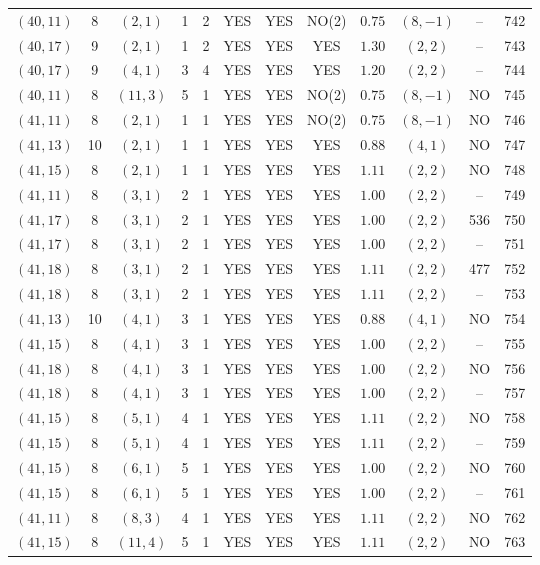 \begin{longtable}{|c|c|c|c|c|c|c|c|c|c|c|c|}
$(40,11)$ & 8 & $(2,1)$ & 1 & 2 & YES & YES & NO(2) & $0.75$ & $(8,-1)$ & -- & 742\\
$(40,17)$ & 9 & $(2,1)$ & 1 & 2 & YES & YES & YES & $1.30$ & $(2,2)$ & -- & 743\\
$(40,17)$ & 9 & $(4,1)$ & 3 & 4 & YES & YES & YES & $1.20$ & $(2,2)$ & -- & 744\\
$(40,11)$ & 8 & $(11,3)$ & 5 & 1 & YES & YES & NO(2) & $0.75$ & $(8,-1)$ & NO & 745\\
$(41,11)$ & 8 & $(2,1)$ & 1 & 1 & YES & YES & NO(2) & $0.75$ & $(8,-1)$ & NO & 746\\
$(41,13)$ & 10 & $(2,1)$ & 1 & 1 & YES & YES & YES & $0.88$ & $(4,1)$ & NO & 747\\
$(41,15)$ & 8 & $(2,1)$ & 1 & 1 & YES & YES & YES & $1.11$ & $(2,2)$ & NO & 748\\
$(41,11)$ & 8 & $(3,1)$ & 2 & 1 & YES & YES & YES & $1.00$ & $(2,2)$ & -- & 749\\
$(41,17)$ & 8 & $(3,1)$ & 2 & 1 & YES & YES & YES & $1.00$ & $(2,2)$ & 536 & 750\\
$(41,17)$ & 8 & $(3,1)$ & 2 & 1 & YES & YES & YES & $1.00$ & $(2,2)$ & -- & 751\\
$(41,18)$ & 8 & $(3,1)$ & 2 & 1 & YES & YES & YES & $1.11$ & $(2,2)$ & 477 & 752\\
$(41,18)$ & 8 & $(3,1)$ & 2 & 1 & YES & YES & YES & $1.11$ & $(2,2)$ & -- & 753\\
$(41,13)$ & 10 & $(4,1)$ & 3 & 1 & YES & YES & YES & $0.88$ & $(4,1)$ & NO & 754\\
$(41,15)$ & 8 & $(4,1)$ & 3 & 1 & YES & YES & YES & $1.00$ & $(2,2)$ & -- & 755\\
$(41,18)$ & 8 & $(4,1)$ & 3 & 1 & YES & YES & YES & $1.00$ & $(2,2)$ & NO & 756\\
$(41,18)$ & 8 & $(4,1)$ & 3 & 1 & YES & YES & YES & $1.00$ & $(2,2)$ & -- & 757\\
$(41,15)$ & 8 & $(5,1)$ & 4 & 1 & YES & YES & YES & $1.11$ & $(2,2)$ & NO & 758\\
$(41,15)$ & 8 & $(5,1)$ & 4 & 1 & YES & YES & YES & $1.11$ & $(2,2)$ & -- & 759\\
$(41,15)$ & 8 & $(6,1)$ & 5 & 1 & YES & YES & YES & $1.00$ & $(2,2)$ & NO & 760\\
$(41,15)$ & 8 & $(6,1)$ & 5 & 1 & YES & YES & YES & $1.00$ & $(2,2)$ & -- & 761\\
$(41,11)$ & 8 & $(8,3)$ & 4 & 1 & YES & YES & YES & $1.11$ & $(2,2)$ & NO & 762\\
$(41,15)$ & 8 & $(11,4)$ & 5 & 1 & YES & YES & YES & $1.11$ & $(2,2)$ & NO & 763\\

\end{longtable}
